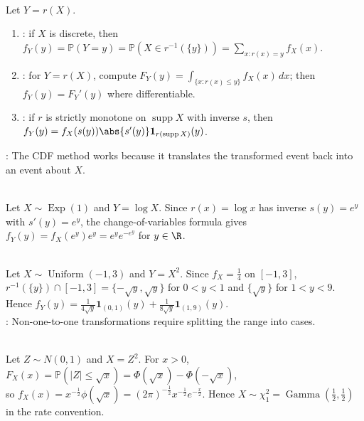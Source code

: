 \begin{method} \label{meth:one-variable-transformation-cdf-method} \\
Let $Y=r(X)$.
\begin{enumerate}[label=(\roman*)]
\setlength{\itemsep}{0pt}
\item {}: if $X$ is discrete, then $f_Y(y)=\mathbb{P}(Y=y)=\mathbb{P}(X\in r^{-1}(\{y\}))=\sum\limits_{x:r(x)=y}f_X(x)$.
\item {}: for $Y=r(X)$, compute $F_Y(y)=\int_{\{x:r(x)\leq y\}}f_X(x)\,dx$; then $f_Y(y)=F_Y'(y)$ where differentiable.
\item {}: if $r$ is strictly monotone on $\operatorname{supp}X$ with inverse $s$, then $f_Y(y)=f_X(s(y))\abs{s'(y)}\mathbf{1}_{r(\operatorname{supp}X)}(y)$.
\end{enumerate}
: The CDF method works because it translates the transformed event back into an event about $X$.
\end{method}

\begin{example} \label{ex:log-transform-exponential} \\
Let $X\sim\operatorname{Exp}(1)$ and $Y=\log X$. Since $r(x)=\log x$ has inverse $s(y)=e^y$ with $s'(y)=e^y$, the change-of-variables formula gives $f_Y(y)=f_X(e^y)e^y=e^ye^{-e^y}$ for $y\in\R$.
\end{example}

\begin{example} \label{ex:square-transform-nonmonotone-uniform} \\
Let $X\sim\operatorname{Uniform}(-1,3)$ and $Y=X^2$. Since $f_X=\frac{1}{4}$ on $[-1,3]$, $r^{-1}(\{y\})\cap[-1,3]=\{-\sqrt y,\sqrt y\}$ for $0<y<1$ and $\{\sqrt y\}$ for $1<y<9$. Hence $f_Y(y)=\frac{1}{4\sqrt y}\mathbf{1}_{(0,1)}(y)+\frac{1}{8\sqrt y}\mathbf{1}_{(1,9)}(y)$.\\
: Non-one-to-one transformations require splitting the range into cases.
\end{example}

\begin{example} \label{ex:standard-normal-square-chi-square} \\
Let $Z\sim N(0,1)$ and $X=Z^2$. For $x>0$, $F_X(x)=\mathbb{P}(|Z|\leq\sqrt{x})=\Phi(\sqrt{x})-\Phi(-\sqrt{x})$,\\
so $f_X(x)=x^{-\frac{1}{2}}\phi(\sqrt{x})=(2\pi)^{-\frac{1}{2}}x^{-\frac{1}{2}}e^{-\frac{x}{2}}$. Hence $X\sim\chi_1^2=\operatorname{Gamma}(\frac{1}{2},\frac{1}{2})$ in the rate convention.
\end{example}

